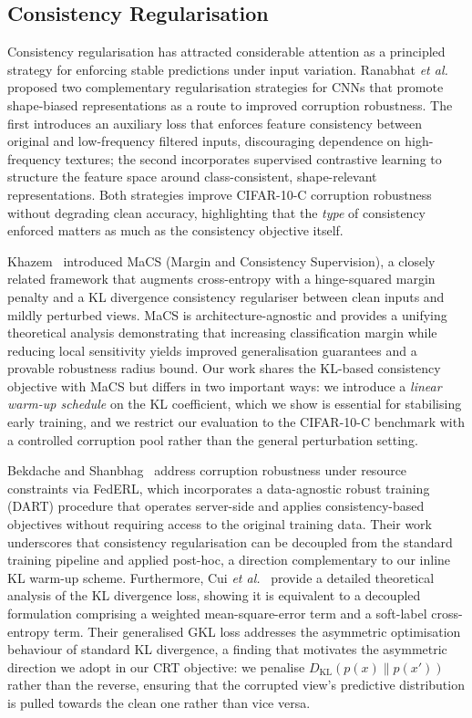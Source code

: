 \documentclass[10pt,twocolumn]{article}
\begin{document}
\subsection{Consistency Regularisation}

Consistency regularisation has attracted considerable attention as a principled strategy for enforcing stable predictions under input variation. Ranabhat \emph{et al.}~\cite{ranabhat2025shapebias} proposed two complementary regularisation strategies for CNNs that promote shape-biased representations as a route to improved corruption robustness. The first introduces an auxiliary loss that enforces feature consistency between original and low-frequency filtered inputs, discouraging dependence on high-frequency textures; the second incorporates supervised contrastive learning to structure the feature space around class-consistent, shape-relevant representations. Both strategies improve CIFAR-10-C corruption robustness without degrading clean accuracy, highlighting that the \emph{type} of consistency enforced matters as much as the consistency objective itself.

Khazem~\cite{khazem2026macs} introduced MaCS (Margin and Consistency Supervision), a closely related framework that augments cross-entropy with a hinge-squared margin penalty and a KL divergence consistency regulariser between clean inputs and mildly perturbed views. MaCS is architecture-agnostic and provides a unifying theoretical analysis demonstrating that increasing classification margin while reducing local sensitivity yields improved generalisation guarantees and a provable robustness radius bound. Our work shares the KL-based consistency objective with MaCS but differs in two important ways: we introduce a \emph{linear warm-up schedule} on the KL coefficient, which we show is essential for stabilising early training, and we restrict our evaluation to the CIFAR-10-C benchmark with a controlled corruption pool rather than the general perturbation setting.

Bekdache and Shanbhag~\cite{bekdache2025federl} address corruption robustness under resource constraints via FedERL, which incorporates a data-agnostic robust training (DART) procedure that operates server-side and applies consistency-based objectives without requiring access to the original training data. Their work underscores that consistency regularisation can be decoupled from the standard training pipeline and applied post-hoc, a direction complementary to our inline KL warm-up scheme. Furthermore, Cui \emph{et al.}~\cite{cui2025gkl} provide a detailed theoretical analysis of the KL divergence loss, showing it is equivalent to a decoupled formulation comprising a weighted mean-square-error term and a soft-label cross-entropy term. Their generalised GKL loss addresses the asymmetric optimisation behaviour of standard KL divergence, a finding that motivates the asymmetric direction we adopt in our CRT objective: we penalise $D_{\mathrm{KL}}(p(x) \| p(x'))$ rather than the reverse, ensuring that the corrupted view's predictive distribution is pulled towards the clean one rather than vice versa.
\end{document}
